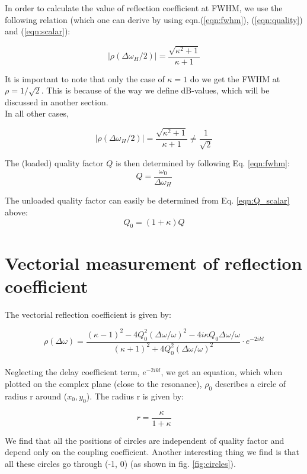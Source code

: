 \documentclass[a4paper]{report}
\numberwithin{equation}{section}
\begin{document}
In order to calculate the value of reflection coefficient at FWHM, we use the following relation (which one can derive by using eqn.(\ref{eqn:fwhm}), (\ref{eqn:quality}) and (\ref{eqn:scalar}):

\begin{equation}
		\left| \rho (\Delta \omega_{H}/2) \right| = \frac{\sqrt{\kappa^2 + 1} }{\kappa +1} 
		\label{eqn:rho_fwhm}
\end{equation}

It is important to note that only the case of $\kappa = 1$ do we get the FWHM at $\rho = 1 / \sqrt{2} $. This is because of the way we define dB-values, which will be discussed in another section. \\
In all other cases, 

\[
		\left| \rho (\Delta \omega_{H}/2) \right| = \frac{\sqrt{\kappa^2 + 1} }{\kappa +1} \ne \frac{1}{\sqrt{2} } 
\]

The (loaded) quality factor $Q$ is then determined by following Eq.
\ref{eqn:fwhm}:
\begin{equation}
	Q = \frac{\omega_0}{\Delta\omega_H}
	\label{eqn:Q_scalar}
\end{equation}

The unloaded quality factor can easily be determined from Eq. \ref{eqn:Q_scalar}
above:
\begin{equation}
	Q_0 = (1 + \kappa)Q
	\label{eqn:Q0_scalar}
\end{equation}

\section{Vectorial measurement of reflection coefficient}
The vectorial reflection coefficient is given by: 

\begin{equation}
		\rho (\Delta \omega) = \frac{(\kappa - 1)^2 - 4Q_{0}^2 \left(\Delta \omega / \omega \right)^2 - 4i \kappa Q_{0} \Delta\omega / \omega}{(\kappa + 1)^2 + 4Q_{0}^2 \left(\Delta \omega / \omega \right)^2}  \cdot e^{-2ikl}
\end{equation}
\\
Neglecting the delay coefficient term, $e^{-2ikl}$, we get an equation, which when plotted on the complex plane (close to the resonance), $\rho_{0}$ describes a circle of radius r around ($x_{0}, y_{0}$).  The radius r is given by: 

\[
		r = \frac{\kappa}{1+ \kappa}
\]

We find that all the positions of circles are independent of quality factor and depend only on the coupling coefficient. Another interesting thing we find is that all these circles go through (-1, 0) (as shown in fig. \ref{fig:circles}). 
\end{document}
